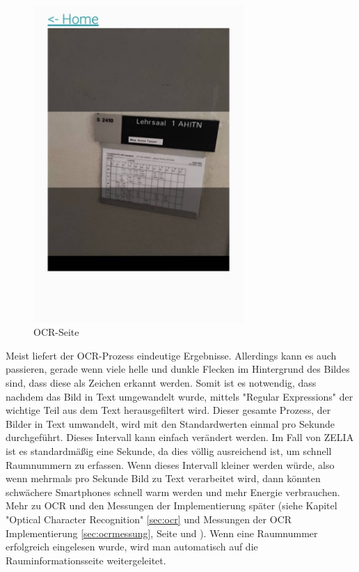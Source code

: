 \begin{figure}[H]
    \centering
    \includegraphics[width=80mm]{media/WebComponents/OCRSeite_light.jpg}
    \caption{OCR-Seite}
    \label{fig:ocrpage}
\end{figure}


Meist liefert der OCR-Prozess eindeutige Ergebnisse. Allerdings kann es auch passieren, gerade wenn viele helle und dunkle Flecken im Hintergrund des Bildes sind, dass diese als Zeichen erkannt werden. Somit ist es notwendig, dass nachdem das Bild in Text umgewandelt wurde, mittels "Regular Expressions" der wichtige Teil aus dem Text herausgefiltert wird. Dieser gesamte Prozess, der Bilder in Text umwandelt, wird mit den Standardwerten einmal pro Sekunde durchgeführt. Dieses Intervall kann einfach verändert werden. Im Fall von ZELIA ist es standardmäßig eine Sekunde, da dies völlig ausreichend ist, um schnell Raumnummern zu erfassen. Wenn dieses Intervall kleiner werden würde, also wenn mehrmals pro Sekunde Bild zu Text verarbeitet wird, dann könnten schwächere Smartphones schnell warm werden und mehr Energie verbrauchen. Mehr zu OCR und den Messungen der Implementierung später (siehe Kapitel "Optical Character Recognition" \ref{sec:ocr} und Messungen der OCR Implementierung \ref{sec:ocrmessung}, Seite \pageref{sec:ocr} und \pageref{sec:ocrmessung}). Wenn eine Raumnummer erfolgreich eingelesen wurde, wird man automatisch auf die Rauminformationsseite weitergeleitet.

